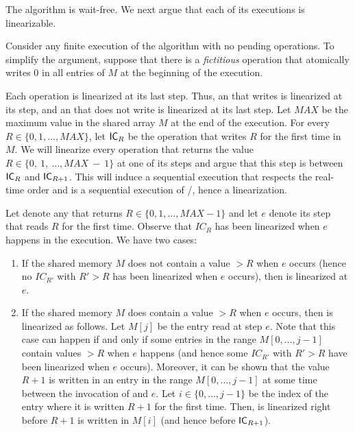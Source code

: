 \begin{proofT}
The algorithm is wait-free. We next argue that each of its executions is linearizable.

Consider any finite execution of the algorithm with no pending operations. To simplify the argument, suppose that there is a \emph{fictitious} \IC operation that atomically writes 0 in all entries of $M$ at the beginning of the execution.

Each \IC operation is linearized at its last step. Thus, an \IC that writes is linearized at its \W step, and an \IC that does not write is linearized at its last \R step. Let $MAX$ be the maximum value in the shared array $M$ at the end of the execution. For every $R \in \{0,1, \hdots, MAX\}$, let ${\sf IC}_R$ be the \IC operation that writes $R$ for the first time in $M$. We will linearize every \LL operation that returns the value $R \in \{0,\ 1,\ \hdots, MAX\ -\ 1\}$ at one of its steps and argue that this step is between ${\sf IC}_R$ and ${\sf IC}_{R+1}$. This will induce a sequential execution that respects the real-time order and is a sequential execution of \LL/\IC, hence a linearization.

Let \op denote any \LL that returns $R \in \{0, 1, \hdots, MAX-1\}$ and let $e$ denote its \R step that reads $R$ for the first time. Observe that $IC_R$ has been linearized when $e$ happens in the execution. We have two cases:

\begin{enumerate}
\item If the shared memory $M$ does not contain a value $> R$ when $e$ occurs (hence no $IC_{R'}$ with $R' > R$ has been linearized when $e$ occurs), then \op is linearized at $e$.

\item If the shared memory $M$ does contain a value $> R$ when $e$ occurs, then \op is linearized as follows.  Let $M[j]$ be the entry read at step $e$. Note that this case can happen if and only if some entries in the range $M[0, \hdots, j-1]$ contain values $> R$ when $e$ happens (and hence some $IC_{R'}$ with $R' > R$ have been linearized when $e$ occurs). Moreover, it can be shown that the value $R+1$ is written in an entry in the range $M[0, \hdots, j-1]$ at some time between the invocation of \op and $e$. Let $i \in \{0, \hdots, j-1\}$ be the index of the entry where it is written $R+1$ for the first time. Then, \op is linearized right before $R+1$ is written in $M[i]$ (and hence before ${\sf IC}_{R+1}$).
\end{enumerate}
\end{proofT}

